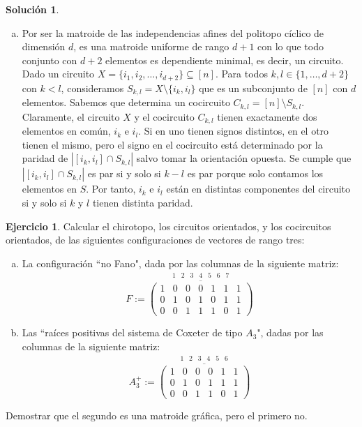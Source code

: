 \documentclass[10pt]{article}
\theoremstyle{definition}
\newtheorem{ejer}{Ejercicio}
\newtheorem*{sol}{Solución}
\begin{document}
\begin{sol}
\begin{enumerate}[(a)]
\item Por ser la matroide de las independencias afines del politopo cíclico de dimensión $d$, es una matroide uniforme de rango $d+1$ con lo que todo conjunto con $d+2$ elementos es dependiente minimal, es decir, un circuito.
Dado un circuito $X=\{i_1,i_2,\ldots, i_{d+2}\}\subseteq [n]$. Para todos $k,l\in\{1,\ldots, d+2\}$ con $k<l$, consideramos $S_{k,l}=X\setminus\{i_k,i_l\}$ que es un subconjunto de $[n]$ con $d$ elementos. Sabemos que determina un cocircuito $C_{k,l}=[n]\setminus S_{k,l}$. Claramente, el circuito $X$ y el cocircuito $C_{k,l}$ tienen exactamente dos elementos en común, $i_k$ e $i_l$. Si en uno tienen signos distintos, en el otro tienen el mismo, pero el signo en el cocircuito está determinado por la paridad de $|[i_k,i_l]\cap S_{k,l}|$ salvo tomar la orientación opuesta. Se cumple que $|[i_k,i_l]\cap S_{k,l}|$ es par si y solo si $k-l$ es par porque solo contamos los elementos en $S$. Por tanto, $i_k$ e $i_l$ están en distintas componentes del circuito si y solo si $k$ y $l$ tienen distinta paridad.
\end{enumerate}
\end{sol}
\begin{ejer}Calcular el chirotopo, los circuitos orientados, y los cocircuitos orientados, de las siguientes configuraciones de vectores de rango tres:
\begin{enumerate}[(a)]
    \item La configuración ``no Fano", dada por las columnas de la siguiente matriz:
    $$F:=\overset{\begin{matrix}1 & 2 & 3 & 4 & 5 & 6 & 7\end{matrix}}{\overline{\begin{pmatrix}1 & 0 & 0 & 0 & 1 & 1 & 1 \\
    0 & 1 & 0 & 1 & 0 & 1 & 1\\
    0 & 0 & 1 & 1 & 1 & 0 & 1\end{pmatrix}}}$$
    \item Las ``raíces positivas del sistema de Coxeter de tipo $A_3$", dadas por las columnas de la siguiente matriz:
    $$A_3^+:=\overset{\begin{matrix}1 & 2 & 3 & 4 & 5 & 6\end{matrix}}{\overline{\begin{pmatrix}1 & 0 & 0 & 0 & 1 & 1 \\
    0 & 1 & 0 & 1 & 1 & 1\\
    0 & 0 & 1 & 1 & 0 & 1\end{pmatrix}}}$$
\end{enumerate}
Demostrar que el segundo es una matroide gráfica, pero el primero no.

\end{ejer}
\end{document}
